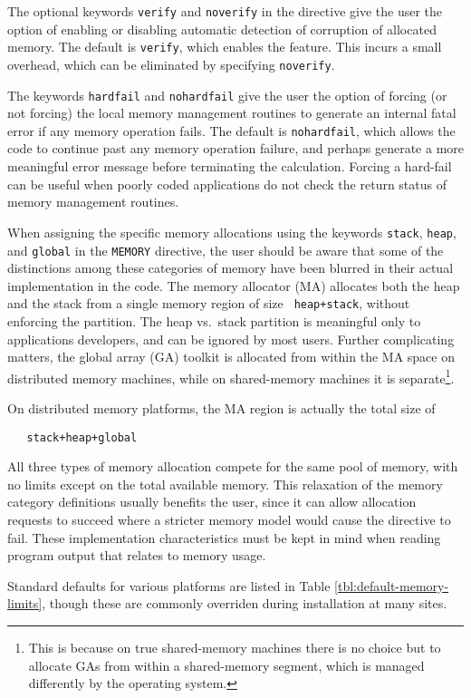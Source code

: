 The optional keywords \verb+verify+ and \verb+noverify+ in the
directive give the user the option of enabling or disabling automatic
detection of corruption of allocated memory.  The default is
\verb+verify+, which enables the feature. This incurs a small
overhead, which can be eliminated by specifying \verb+noverify+.

The keywords \verb+hardfail+ and \verb+nohardfail+ give the user the
option of forcing (or not forcing) the local memory management
routines to generate an internal fatal error if any memory operation
fails.  The default is \verb+nohardfail+, which allows the code to
continue past any memory operation failure, and perhaps generate a
more meaningful error message before terminating the calculation.
Forcing a hard-fail can be useful when poorly coded applications do
not check the return status of memory management routines.

When assigning the specific memory allocations using the keywords
\verb+stack+, \verb+heap+, and \verb+global+ in the \verb+MEMORY+
directive, the user should be aware that some of the distinctions
among these categories of memory have been blurred in their actual
implementation in the code.  The memory allocator (MA) allocates both
the heap and the stack from a single memory region of size {\tt
  heap+stack}, without enforcing the partition.  The heap vs.\ stack
partition is meaningful only to applications developers, and can be
ignored by most users.  Further complicating matters, the global array
(GA) toolkit is allocated from within the MA space on distributed
memory machines, while on shared-memory machines it is
separate\footnote{This is because on true shared-memory machines there
  is no choice but to allocate GAs from within a shared-memory
  segment, which is managed differently by the operating system.}.

On distributed memory platforms, the MA region is actually the total
size of 
\begin{verbatim}
   stack+heap+global
\end{verbatim}
All three types of memory allocation
compete for the same pool of memory, with no limits except on the
total available memory.  This relaxation of the memory category
definitions usually benefits the user, since it can allow allocation
requests to succeed where a stricter memory model would cause the
directive to fail.  These implementation characteristics must be kept
in mind when reading program output that relates to memory usage.

Standard defaults for various platforms are listed in Table
\ref{tbl:default-memory-limits}, though these are commonly 
overriden during installation at many sites.

